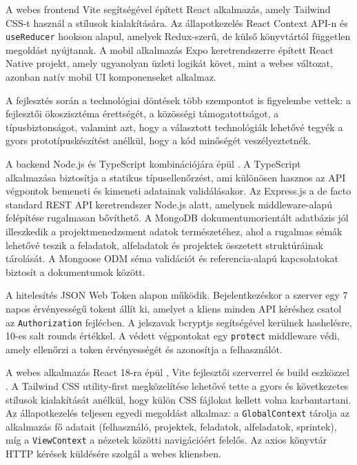 A webes frontend Vite segítségével épített React alkalmazás, amely Tailwind CSS-t használ a stílusok kialakítására. Az állapotkezelés React Context API-n és \texttt{useReducer} hookson alapul, amelyek Redux-szerű, de külső könyvtártól független megoldást nyújtanak. A mobil alkalmazás Expo keretrendszerre épített React Native projekt, amely ugyanolyan üzleti logikát követ, mint a webes változat, azonban natív mobil UI komponenseket alkalmaz.



A fejlesztés során a technológiai döntések több szempontot is figyelembe vettek: a fejlesztői ökoszisztéma érettségét, a közösségi támogatottságot, a típusbiztonságot, valamint azt, hogy a választott technológiák lehetővé tegyék a gyors prototípuskészítést anélkül, hogy a kód minőségét veszélyeztetnék.


A backend Node.js és TypeScript kombinációjára épül \cite{typescript}. A TypeScript alkalmazása biztosítja a statikus típusellenőrzést, ami különösen hasznos az API végpontok bemeneti és kimeneti adatainak validálásakor. Az Express.js a de facto standard REST API keretrendszer Node.js alatt, amelynek middleware-alapú felépítése rugalmasan bővíthető. A MongoDB dokumentumorientált adatbázis jól illeszkedik a projektmenedzsment adatok természetéhez, ahol a rugalmas sémák lehetővé teszik a feladatok, alfeladatok és projektek összetett struktúráinak tárolását. A Mongoose ODM séma validációt és referencia-alapú kapcsolatokat biztosít a dokumentumok között.

A hitelesítés JSON Web Token alapon működik. Bejelentkezéskor a szerver egy 7 napos érvényességű tokent állít ki, amelyet a kliens minden API kéréshez csatol az \texttt{Authorization} fejlécben. A jelszavak bcryptjs segítségével kerülnek hashelésre, 10-es salt rounds értékkel. A védett végpontokat egy \texttt{protect} middleware védi, amely ellenőrzi a token érvényességét és azonosítja a felhasználót.


A webes alkalmazás React 18-ra épül \cite{react}, Vite fejlesztői szerverrel és build eszközzel \cite{vite}. A Tailwind CSS \cite{tailwind} utility-first megközelítése lehetővé tette a gyors és következetes stílusok kialakítását anélkül, hogy külön CSS fájlokat kellett volna karbantartani. Az állapotkezelés teljesen egyedi megoldást alkalmaz: a \texttt{GlobalContext} tárolja az alkalmazás fő adatait (felhasználó, projektek, feladatok, alfeladatok, sprintek), míg a \texttt{ViewContext} a nézetek közötti navigációért felelős. Az axios könyvtár \cite{axios} HTTP kérések küldésére szolgál a webes kliensben.

